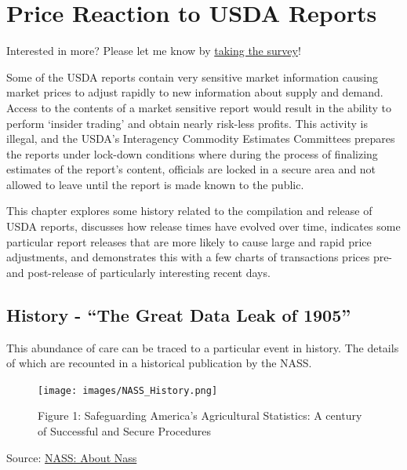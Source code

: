 \documentclass[
  letterpaper,
  DIV=11,
  numbers=noendperiod]{scrreprt}
\begin{document}

\chapter{Price Reaction to USDA
Reports}\label{price-reaction-to-usda-reports-1}

{Interested in more? Please let me know by}
\href{https://forms.gle/Q3VByCQZHjfQSy9D7}{taking the survey}!

Some of the USDA reports contain very sensitive market information
causing market prices to adjust rapidly to new information about supply
and demand. Access to the contents of a market sensitive report would
result in the ability to perform `insider trading' and obtain nearly
risk-less profits. This activity is illegal, and the USDA's Interagency
Commodity Estimates Committees prepares the reports under lock-down
conditions where during the process of finalizing estimates of the
report's content, officials are locked in a secure area and not allowed
to leave until the report is made known to the public.

This chapter explores some history related to the compilation and
release of USDA reports, discusses how release times have evolved over
time, indicates some particular report releases that are more likely to
cause large and rapid price adjustments, and demonstrates this with a
few charts of transactions prices pre- and post-release of particularly
interesting recent days.

\section{History - ``The Great Data Leak of
1905''}\label{history---the-great-data-leak-of-1905-1}

This abundance of care can be traced to a particular event in history.
The details of which are recounted in a historical publication by the
NASS.

\begin{figure}[H]

{\centering \texttt{[image: images/NASS\_History.png]}

}

\caption{Figure 1: Safeguarding America's Agricultural Statistics: A
century of Successful and Secure Procedures}

\end{figure}%

Source:
\href{pdf-Readings/safegaurding-americas-agricultural-statistics.pdf}{NASS:
About Nass}
\end{document}
